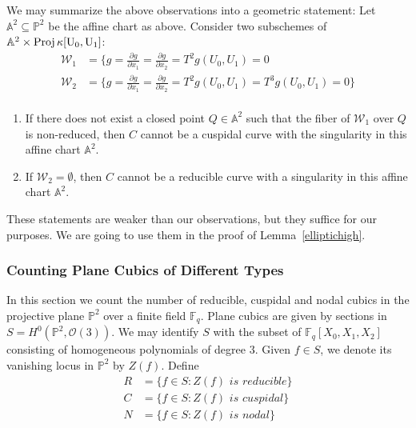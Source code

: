 \documentclass[12pt]{article}
\theoremstyle{plain}
\theoremstyle{definition}
\newcommand{\IA}{\mathbb{A}}
\newcommand{\IF}{\mathbb{F}}
\newcommand{\IP}{\mathbb{P}}
\newcommand{\sO}{\mathcal{O}}
\newcommand{\Proj}{\rm Proj\,}
\newcommand{\<}{\langle}
\renewcommand{\>}{\rangle}
\newcommand{\p}{\partial}
\newcommand{\sW}{\mathcal{W}}
\begin{document}
We may summarize the above observations into a geometric statement: Let $\IA^2 \subseteq \IP^2$ be the affine chart as above. Consider two subschemes of $\IA^2 \times \Proj \kappa[U_0, U_1]$: 
\begin{align*}
\sW_1 &= \{ g = \frac{\p g}{\p x_1} = \frac{\p g}{\p x_2} = T^2 g(U_0, U_1) = 0 \\
\sW_2 &= \{ g = \frac{\p g}{\p x_1} = \frac{\p g}{\p x_2} = T^2 g(U_0, U_1) = T^3 g(U_0, U_1) = 0 \} \\
\end{align*} 
\begin{enumerate}
\item If there does not exist a closed point $Q \in \IA^2$ such that the fiber of $\sW_1$ over $Q$ is non-reduced, then $C$ cannot be a cuspidal curve with the singularity in this affine chart $\IA^2$. 
\item If $\sW_2 = \emptyset$, then $C$ cannot be a reducible curve with a singularity in this affine chart $\IA^2$. 
\end{enumerate}
These statements are weaker than our observations, but they suffice for our purposes. We are going to use them in the proof of Lemma~\ref{elliptichigh}. 


\subsubsection{Counting Plane Cubics of Different Types}
In this section we count the number of reducible, cuspidal and nodal cubics in the projective plane $\IP^2$ over a finite field $\IF_q$. Plane cubics are given by sections in $S = H^0(\IP^2, \sO(3))$. We may identify $S$ with the subset of $\IF_q[X_0, X_1, X_2]$ consisting of homogeneous polynomials of degree $3$. Given $f \in S$, we denote its vanishing locus in $\IP^2$ by $Z(f)$. Define 
\begin{align*}
R &= \{ f \in S : Z(f) \textit{ is reducible} \} \\
C &= \{ f \in S : Z(f) \textit{ is cuspidal} \} \\
N &= \{ f \in S : Z(f) \textit{ is nodal} \}
\end{align*}
\end{document}
